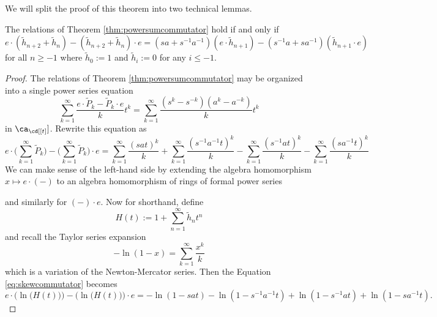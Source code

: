 We will split the proof of this theorem into two technical lemmas.

\begin{lemma} \label{lem:powersumcommutator1}
The relations of Theorem \ref{thm:powersumcommutator} hold if and only if 
\begin{equation} \label{eq:skewcommutator}
e \cdot (\tilde{h}_{n+2} + \tilde{h}_n) - (\tilde{h}_{n+2} + \tilde{h}_n) \cdot e = (sa + s^{-1}a^{-1}) (e \cdot \tilde{h}_{n+1}) - (s^{-1}a + sa^{-1}) (\tilde{h}_{n+1} \cdot e)
\end{equation}
for all $n \geq -1$ where $\tilde{h}_0 := 1$ and $\tilde{h}_{i} := 0$ for any $i \leq -1$. 
\end{lemma}
\begin{proof}
The relations of Theorem \ref{thm:powersumcommutator} may be organized into a single power series equation
\begin{equation} \label{eq:skewcommutator}
\sum_{k=1}^\infty \frac{e \cdot \tilde{P}_k - \tilde{P}_k \cdot e}{k} t^k = \sum_{k=1}^{\infty} \frac {(s^k - s^{-k}) (a^k - a^{-k})}{k} t^k
\end{equation}
in $\ca_\cd [[t]]$. Rewrite this equation as
\begin{equation} \label{eq:powersumcommutator2} 
e \cdot \Bigg( \sum_{k=1}^\infty \tilde{P}_k \Bigg) - \Bigg( \sum_{k=1}^\infty \tilde{P}_k \Bigg) \cdot e = \sum_{k=1}^{\infty} \frac {(sat)^k}{k} + \sum_{k=1}^{\infty} \frac {(s^{-1}a^{-1}t)^k}{k} - \sum_{k=1}^{\infty} \frac {(s^{-1}at)^k}{k} - \sum_{k=1}^{\infty} \frac {(sa^{-1}t)^k}{k}
\end{equation}
We can make sense of the left-hand side by extending the algebra homomorphism $x \mapsto e \cdot (-)$ to an algebra homomorphism of rings of formal power series
\begin{center}
\end{center}
and similarly for $(-) \cdot e$. Now for shorthand, define 
\[
H(t) := 1 + \sum_{n=1}^\infty \tilde{h}_n t^n
\]
and recall the Taylor series expansion
\[
-\ln(1-x) = \sum_{k=1}^\infty \frac{x^k}{k}
\]
which is a variation of the Newton-Mercator series. Then the Equation \eqref{eq:skewcommutator} becomes
\begin{equation} \label{eq:powersumcommutator3} 
e \cdot \Big( \ln\big(H(t)\big) \Big) - \big( \ln \big(H(t)\big) \Big) \cdot e = - \ln(1 - sat) - \ln(1 - s^{-1}a^{-1}t) + \ln(1 - s^{-1}at) + \ln(1 - sa^{-1}t).

\end{equation}
\end{proof}
